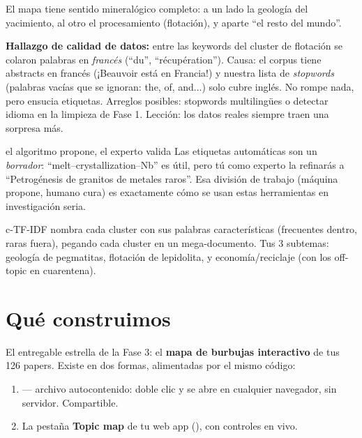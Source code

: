 \documentclass[11pt,a4paper]{article}
\begin{document}
El mapa tiene sentido mineralógico completo: a un lado la geología del yacimiento, al otro el
procesamiento (flotación), y aparte ``el resto del mundo''.

\begin{ojo}
\textbf{Hallazgo de calidad de datos:} entre las keywords del cluster de flotación se colaron
palabras en \emph{francés} (``du'', ``récupération''). Causa: el corpus tiene abstracts en
francés (¡Beauvoir está en Francia!) y nuestra lista de \emph{stopwords} (palabras vacías que
se ignoran: the, of, and...) solo cubre inglés. No rompe nada, pero ensucia etiquetas.
Arreglos posibles: stopwords multilingües o detectar idioma en la limpieza de Fase 1.
Lección: los datos reales siempre traen una sorpresa más.
\end{ojo}

\begin{concepto}{el algoritmo propone, el experto valida}
Las etiquetas automáticas son un \emph{borrador}: ``melt--crystallization--Nb'' es útil, pero
tú como experto la refinarás a ``Petrogénesis de granitos de metales raros''. Esa división de
trabajo (máquina propone, humano cura) es exactamente cómo se usan estas herramientas en
investigación seria.
\end{concepto}

\begin{resumen}
c-TF-IDF nombra cada cluster con sus palabras características (frecuentes dentro, raras
fuera), pegando cada cluster en un mega-documento. Tus 3 subtemas: geología de pegmatitas,
flotación de lepidolita, y economía/reciclaje (con los off-topic en cuarentena).
\end{resumen}
\clearpage
{}
{}

\section{Qué construimos}

El entregable estrella de la Fase 3: el \textbf{mapa de burbujas interactivo} de tus 126
papers. Existe en dos formas, alimentadas por el mismo código:
\begin{enumerate}
  \item {} --- archivo autocontenido: doble clic y se abre
        en cualquier navegador, sin servidor. Compartible.
  \item La pestaña \textbf{Topic map} de tu web app (), con controles en vivo.
\end{enumerate}
\end{document}
